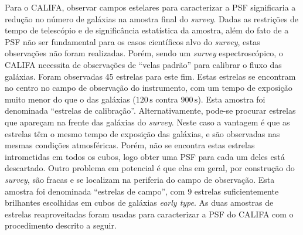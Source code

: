 Para o CALIFA, observar campos estelares para caracterizar a PSF significaria a
redução no número de galáxias na amostra final do {\em survey}. Dadas as
restrições de tempo de telescópio e de significância estatística da amostra,
além do fato de a PSF não ser fundamental para os casos científicos alvo do {\em
survey}, estas observações não foram realizadas. Porém, sendo um {\em survey}
espectroscópico, o CALIFA necessita de observações de ``velas padrão'' para
calibrar o fluxo das galáxias. Foram observadas 45 estrelas para este fim.
Estas estrelas se encontram no centro no campo de observação do instrumento, com
um tempo de exposição muito menor do que o das galáxias ($120\,\mathrm{s}$
contra $900\,\mathrm{s}$). Esta amostra foi denominada ``estrelas de
calibração''. Alternativamente, pode-se procurar estrelas que apareçam na frente
das galáxias do {\em survey}. Neste caso a vantagem é que as estrelas têm o
mesmo tempo de exposição das galáxias, e são observadas nas mesmas condições
atmosféricas. Porém, não se encontra estas estrelas intrometidas em todos os
cubos, logo obter uma PSF para cada um deles está descartado. Outro problema em
potencial é que elas em geral, por construção do {\em survey}, são fracas e se
localizam na periferia do campo de observação. Esta amostra foi denominada
``estrelas de campo'', com 9 estrelas suficientemente brilhantes escolhidas em
cubos de galáxias {\em early type}. As duas amostras de estrelas reaproveitadas
foram usadas para caracterizar a PSF do CALIFA com o procedimento descrito a
seguir.

